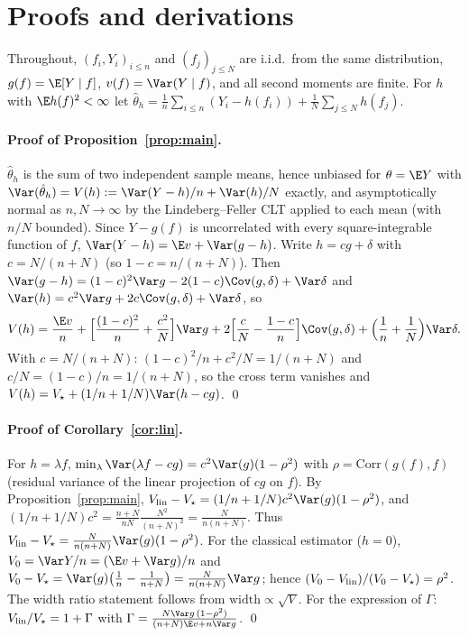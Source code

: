 \section{Proofs and derivations}\label{app:proofs}

Throughout, $(f_i,Y_i)_{i\le n}$ and $(f_j)_{j\le N}$ are i.i.d.\ from the same distribution, $g(f)=\E[Y\mid f]$, $v(f)=\Var(Y\mid f)$, and all second moments are finite. For $h$ with $\E h(f)^2<\infty$ let
$\hat\theta_h=\frac1n\sum_{i\le n}(Y_i-h(f_i))+\frac1N\sum_{j\le N}h(f_j)$.

\paragraph{Proof of Proposition~\ref{prop:main}.}
$\hat\theta_h$ is the sum of two independent sample means, hence unbiased for $\theta=\E Y$ with
$\Var(\hat\theta_h)=V(h):=\Var(Y-h)/n+\Var(h)/N$ exactly, and asymptotically normal as $n,N\to\infty$ by the Lindeberg--Feller CLT applied to each mean (with $n/N$ bounded).
Since $Y-g(f)$ is uncorrelated with every square-integrable function of $f$, $\Var(Y-h)=\E v+\Var(g-h)$. Write $h=cg+\delta$ with $c=N/(n+N)$ (so $1-c=n/(n+N)$). Then
$\Var(g-h)=(1-c)^2\Var g-2(1-c)\Cov(g,\delta)+\Var\delta$ and $\Var(h)=c^2\Var g+2c\Cov(g,\delta)+\Var\delta$, so
\[
V(h)=\frac{\E v}{n}+\Big[\frac{(1-c)^2}{n}+\frac{c^2}{N}\Big]\Var g+2\Big[\frac{c}{N}-\frac{1-c}{n}\Big]\Cov(g,\delta)+\Big(\frac1n+\frac1N\Big)\Var\delta .
\]
With $c=N/(n+N)$: $(1-c)^2/n+c^2/N=1/(n+N)$ and $c/N=(1-c)/n=1/(n+N)$, so the cross term vanishes and $V(h)=V_\star+(1/n+1/N)\Var(h-cg)$. \qed

\paragraph{Proof of Corollary~\ref{cor:lin}.}
For $h=\lambda f$, $\min_\lambda\Var(\lambda f-cg)=c^2\Var(g)(1-\rho^2)$ with $\rho=\mathrm{Corr}(g(f),f)$ (residual variance of the linear projection of $cg$ on $f$). By Proposition~\ref{prop:main}, $V_{\rm lin}-V_\star=(1/n+1/N)c^2\Var(g)(1-\rho^2)$, and $(1/n+1/N)c^2=\frac{n+N}{nN}\frac{N^2}{(n+N)^2}=\frac{N}{n(n+N)}$. Thus $V_{\rm lin}-V_\star=\frac{N}{n(n+N)}\Var(g)(1-\rho^2)$.
For the classical estimator ($h=0$), $V_0=\Var Y/n=(\E v+\Var g)/n$ and $V_0-V_\star=\Var(g)\big(\frac1n-\frac1{n+N}\big)=\frac{N}{n(n+N)}\Var g$; hence $(V_0-V_{\rm lin})/(V_0-V_\star)=\rho^2$. The width ratio statement follows from $\text{width}\propto\sqrt{V}$. For the expression of $\Gamma$: $V_{\rm lin}/V_\star=1+\Gamma$ with
$\Gamma=\frac{N\Var g\,(1-\rho^2)}{(n+N)\E v+n\Var g}$. \qed

